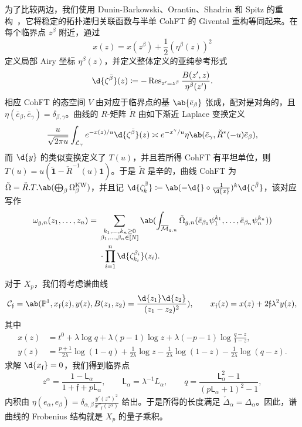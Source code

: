 \documentclass{amsart}
\theoremstyle{definition}
\theoremstyle{remark}
\theoremstyle{plain}
\theoremstyle{definition}
\theoremstyle{remark}
\renewcommand{\P}{\mathbb{P}}
\newcommand{\Mbar}{\overline{\mathcal{M}}}
\newcommand{\mc}[1]{\mathcal{#1}}
\newcommand{\mf}[1]{\mathfrak{#1}}
\newcommand{\mr}[1]{\mathrm{#1}}
\newcommand{\on}[1]{\operatorname{#1}}
\newcommand{\ms}[1]{\mathsf{#1}}
\newcommand{\wt}[1]{\widetilde{#1}}
\newcommand{\1}{\mathbf{1}}
\newcommand{\2}{\mathbf{2}}
\newcommand{\3}{\mathbf{3}}
\begin{document}
为了比较两边，我们使用 Dunin-Barkowski、Orantin、Shadrin 和 Spitz 的重构~\cite{DOSS2014}，它将稳定的拓扑递归关联函数与半单 CohFT 的 Givental 重构等同起来。在每个临界点 \(z^{\beta}\) 附近，通过
\[ x(z) = x(z^{\beta}) + \frac{1}{2}(\eta^{\beta}(z))^2 \]
定义局部 Airy 坐标 \(\eta^{\beta}(z)\)，并定义整体定义的亚纯参考形式
\[ \d{\zeta^{\bar{\beta}}}(z) \coloneqq -\on{Res}_{z'=z^{\beta}}\frac{B(z',z)}{\eta^{\beta}(z')}. \]
相应 CohFT 的态空间 \(V\) 由对应于临界点的基 \(\ab\{\bar{e}_{\beta}\}\) 张成，配对是对角的，且 \(\eta(\bar{e}_{\beta},\bar{e}_{\gamma}) = \delta_{\beta,\gamma}\)。曲线的 \(R\)-矩阵 \(\check{R}\) 由如下渐近 Laplace 变换定义
\[ \frac{u}{\sqrt{2\pi u}}\int_{\mc{L}_{\gamma}} e^{-x(z)/u}\d{\zeta^{\bar{\beta}}}(z) \asymp e^{-x^{\gamma}/u}\eta\ab(\bar{e}_{\gamma}, \check{R}^*(-u)\bar{e}_{\beta}), \]
而 \(\d{y}\) 的类似变换定义了 \(T(u)\)，并且若所得 CohFT 有平坦单位，则 \(T(u) = u(\wt{\1}-\check{R}^{-1}(u)\1)\)。于是 \(\check{R}\) 是辛的，曲线 CohFT 为 \(\check{\Omega} = \check{R}.T.\ab(\bigoplus_{\beta}\Omega^{\mr{KW}}_{\beta})\)，并且记 \(\d{\zeta^{\bar{\beta}}_k} \coloneqq \ab(-\d{} \circ \frac{1}{\d{x}})^k \d{\zeta^{\bar{\beta}}}\)，该对应写作
\begin{align*}
    \omega_{g,n}(z_1,\ldots,z_n) ={}& \sum_{\substack{k_1,\ldots,k_n \geq 0 \\ \beta_1,\ldots,\beta_n \in [N]}}\ab(\int_{\Mbar_{g,n}} \check{\Omega}_{g,n}(\bar{e}_{\beta_1}\psi_1^{k_1},\ldots,\bar{e}_{\beta_n}\psi_n^{k_n})) \\
    &\cdot \prod_{i=1}^n \d{\zeta^{\beta_i}_{k_i}}(z_i).
\end{align*}

对于 \(X_p\)，我们将考虑谱曲线
\[ \mc{C}_{\mf{f}} = \ab(\P^1, x_{\mf{f}}(z), y(z), B(z_1,z_2) = \frac{\d{z_1}\d{z_2}}{(z_1-z_2)^2}), \qquad x_{\mf{f}}(z) = x(z) + 2\mf{f}\lambda^2 y(z), \]
其中
\begin{align*}
    x(z) &= t^0 + \lambda \log q + \lambda(p-1)\log z + \lambda(-p-1)\log\frac{q-z}{1-z}, \\
    y(z) &= \frac{p+1}{2\lambda}\log(1-q) + \frac{1}{2\lambda}\log z - \frac{1}{2\lambda}\log(1-z) - \frac{1}{2\lambda}\log(q-z).
\end{align*}
求解 \(\d{x_{\mf{f}}} = 0\)，我们得到临界点
\[ z^{\alpha} = \frac{1-\ms{L}_{\alpha}}{1+\mf{f}+p\ms{L}_{\alpha}}, \qquad \ms{L}_{\alpha} = \lambda^{-1}L_{\alpha}, \qquad q = \frac{\ms{L}_{\alpha}^2-1}{(p\ms{L}_{\alpha}+1)^2-1}, \]
内积由 \(\eta(e_{\alpha},e_{\beta}) = \delta_{\alpha,\beta}\frac{y'(z^{\alpha})^2}{x''_{\mf{f}}(z^{\alpha})}\) 给出。于是所得的长度满足 \(\check{\Delta}_{\alpha} = \Delta_{\alpha}\)。因此，谱曲线的 Frobenius 结构就是 \(X_p\) 的量子乘积。
\end{document}
